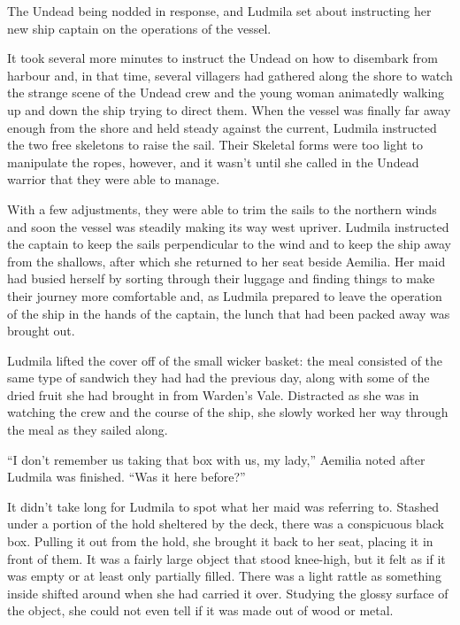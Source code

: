  

The Undead being nodded in response, and Ludmila set about instructing her new ship captain on the operations of the vessel.

 

It took several more minutes to instruct the Undead on how to disembark from harbour and, in that time, several villagers had gathered along the shore to watch the strange scene of the Undead crew and the young woman animatedly walking up and down the ship trying to direct them. When the vessel was finally far away enough from the shore and held steady against the current, Ludmila instructed the two free skeletons to raise the sail. Their Skeletal forms were too light to manipulate the ropes, however, and it wasn’t until she called in the Undead warrior that they were able to manage.

 

With a few adjustments, they were able to trim the sails to the northern winds and soon the vessel was steadily making its way west upriver. Ludmila instructed the captain to keep the sails perpendicular to the wind and to keep the ship away from the shallows, after which she returned to her seat beside Aemilia. Her maid had busied herself by sorting through their luggage and finding things to make their journey more comfortable and, as Ludmila prepared to leave the operation of the ship in the hands of the captain, the lunch that had been packed away was brought out.

 

Ludmila lifted the cover off of the small wicker basket: the meal consisted of the same type of sandwich they had had the previous day, along with some of the dried fruit she had brought in from Warden’s Vale. Distracted as she was in watching the crew and the course of the ship, she slowly worked her way through the meal as they sailed along.

 

“I don’t remember us taking that box with us, my lady,” Aemilia noted after Ludmila was finished. “Was it here before?”

 

It didn’t take long for Ludmila to spot what her maid was referring to. Stashed under a portion of the hold sheltered by the deck, there was a conspicuous black box. Pulling it out from the hold, she brought it back to her seat, placing it in front of them. It was a fairly large object that stood knee-high, but it felt as if it was empty or at least only partially filled. There was a light rattle as something inside shifted around when she had carried it over. Studying the glossy surface of the object, she could not even tell if it was made out of wood or metal.

